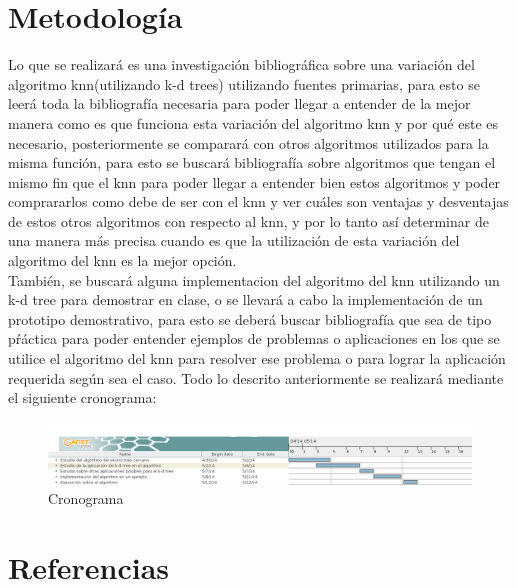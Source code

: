 \documentclass[letterpaper]{article}
\begin{document}
\section{Metodología}

Lo que se realizará es una investigación bibliográfica sobre una variación del algoritmo knn(utilizando k-d trees) utilizando fuentes primarias, para esto se leerá toda la bibliografía necesaria para poder llegar a entender de la mejor manera como es que funciona esta variación del algoritmo knn y por qué este es necesario, posteriormente se comparará con otros algoritmos utilizados para la misma función, para esto se buscará bibliografía sobre algoritmos que tengan el mismo fin que el knn para poder llegar a entender bien estos algoritmos y poder comprararlos como debe de ser con el knn y ver cuáles son ventajas y desventajas de estos otros algoritmos con respecto al knn, y por lo tanto así determinar de una manera más precisa cuando es que la utilización de esta variación del algoritmo del knn es la mejor opción.\\

También, se buscará alguna implementacion del algoritmo del knn utilizando un k-d tree para demostrar en clase, o se llevará a cabo la implementación de un prototipo demostrativo, para esto se deberá buscar bibliografía que sea de tipo pŕáctica para poder entender ejemplos de problemas o aplicaciones en los que se utilice el algoritmo del knn para resolver ese problema o para lograr la aplicación requerida según sea el caso. Todo lo descrito anteriormente se realizará mediante el siguiente cronograma: \\

\begin{figure}[h]
\centering
        \includegraphics[totalheight=2.8cm]{t.png}
    \caption{Cronograma}
    \label{fig:verticalcell}
\end{figure}

\section{Referencias}
\end{document}
